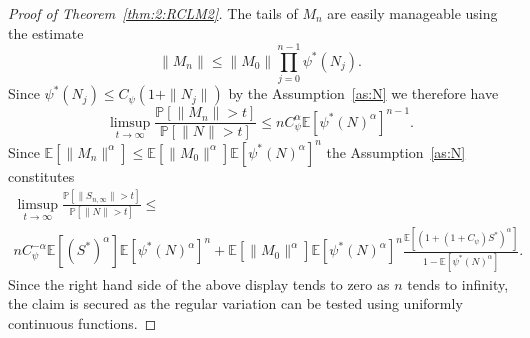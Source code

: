 \documentclass[preprint,12pt]{elsarticle}
\theoremstyle{definition}
\theoremstyle{remark}
\newcommand{\Mbf}{{ M}}
\newcommand{\Nbf}{{ N}}
\newcommand{\Sbf}{{ S}}
\newcommand{\1}{{\mathbf 1}}
\numberwithin{equation}{section}
\newcommand{\Ebb}{\mathbb{E}}  %
\newcommand{\Pbb}{\mathbb{P}}
\begin{document}
\begin{proof}[Proof of Theorem~\ref{thm:2:RCLM2}]
		The tails of $\Mbf_n$ are easily manageable using the estimate
		\begin{equation*}
			\|\Mbf_n\|\leq \|\Mbf_0\| \prod_{j=0}^{n-1} \psi^*(\Nbf_j).
		\end{equation*}
		Since $\psi^*(\Nbf_j) \leq C_{\psi} (1+\|\Nbf_j\|)$ by the Assumption~\ref{as:N} we therefore have
		\begin{equation*}
			\limsup_{t \to \infty} \frac{\Pbb[\|\Mbf_n\|>t]}{\Pbb[\|\Nbf\|>t]} 
			\leq n C_{\psi}^{\alpha} \Ebb[\psi^*(\Nbf)^\alpha]^{n-1}.
		\end{equation*} 
		Since $\Ebb[\|\Mbf_n\|^\alpha] \leq \Ebb [\|\Mbf_0\|^\alpha ] \Ebb[\psi^*(\Nbf)^\alpha]^n$ the Assumption~\ref{as:N} constitutes
		\begin{multline*}
			\limsup_{t \to \infty} \frac{\Pbb[\|\Sbf_{n, \infty}\|>t]}{\Pbb[\|\Nbf\|>t]} 
			\leq \\
            n C_{\psi}^{-\alpha} \Ebb[(\Sbf^*)^\alpha]\Ebb[\psi^*(\Nbf)^\alpha]^{n} + 	
			\Ebb[\|\Mbf_0\|^\alpha]
            \Ebb[\psi^*(\Nbf)^\alpha]^n\frac{\Ebb[ (1+(1+ C_{\psi} ) \Sbf^*)^\alpha]}{1-\Ebb[\psi^*(\Nbf)^\alpha]}.
		\end{multline*}
		Since the right hand side of the above display tends to zero as $n$ tends to infinity, the claim is secured
		as the regular variation can be tested using uniformly continuous functions. 
	\end{proof}

 




\end{document}
